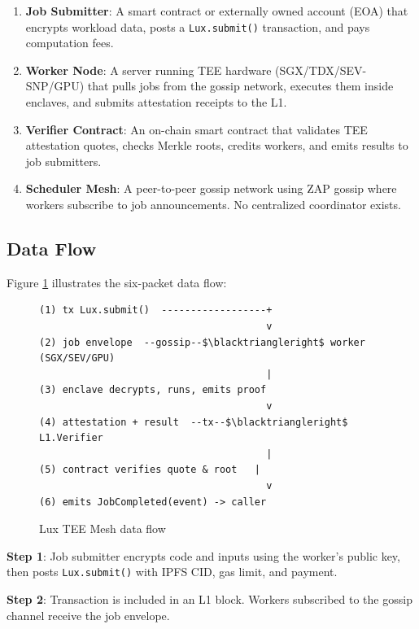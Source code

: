 \begin{enumerate}
  \item \textbf{Job Submitter}: A smart contract or externally owned account (EOA) that encrypts workload data, posts a \texttt{Lux.submit()} transaction, and pays computation fees.

  \item \textbf{Worker Node}: A server running TEE hardware (SGX/TDX/SEV-SNP/GPU) that pulls jobs from the gossip network, executes them inside enclaves, and submits attestation receipts to the L1.

  \item \textbf{Verifier Contract}: An on-chain smart contract that validates TEE attestation quotes, checks Merkle roots, credits workers, and emits results to job submitters.

  \item \textbf{Scheduler Mesh}: A peer-to-peer gossip network using ZAP gossip where workers subscribe to job announcements. No centralized coordinator exists.
\end{enumerate}

\subsection{Data Flow}

Figure \ref{fig:dataflow} illustrates the six-packet data flow:

\begin{figure}[h]
\centering
\begin{verbatim}
(1) tx Lux.submit()  ------------------+
                                       v
(2) job envelope  --gossip--$\blacktriangleright$ worker (SGX/SEV/GPU)
                                       |
(3) enclave decrypts, runs, emits proof
                                       v
(4) attestation + result  --tx--$\blacktriangleright$ L1.Verifier
                                       |
(5) contract verifies quote & root   |
                                       v
(6) emits JobCompleted(event) -> caller
\end{verbatim}
\caption{Lux TEE Mesh data flow}
\label{fig:dataflow}
\end{figure}

\textbf{Step 1}: Job submitter encrypts code and inputs using the worker's public key, then posts \texttt{Lux.submit()} with IPFS CID, gas limit, and payment.

\textbf{Step 2}: Transaction is included in an L1 block. Workers subscribed to the gossip channel receive the job envelope.

